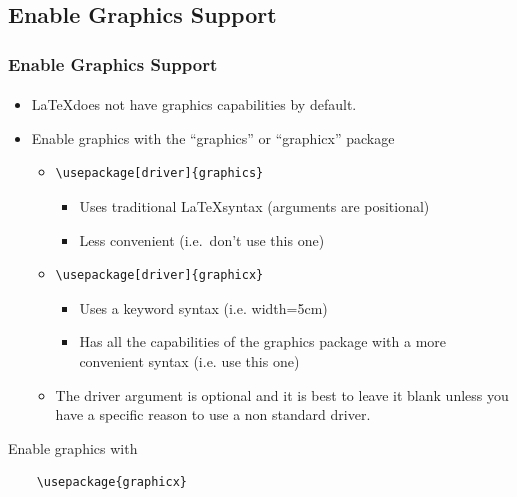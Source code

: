 \documentclass[article]{beamer}
\begin{document}
\subsection{Enable Graphics Support}
\begin{frame}
  \frametitle{Enable Graphics Support}
  \framesubtitle{}
  \begin{itemize}%
    \item \LaTeX does not have graphics capabilities by default.
    \item Enable graphics with the ``graphics'' or ``graphicx'' package
      \begin{itemize}%
        \item \begin{verbatim}\usepackage[driver]{graphics}\end{verbatim}
          \begin{itemize}%
            \item Uses traditional \LaTeX syntax (arguments are positional)
            \item Less convenient (i.e.\ don't use this one)
          \end{itemize}
        \item \begin{verbatim}\usepackage[driver]{graphicx}\end{verbatim} 
          \begin{itemize}%
            \item Uses a keyword syntax (i.e. width=5cm)
            \item Has all the capabilities of the graphics package with a more convenient syntax (i.e. use this one)
          \end{itemize}
        \item The driver argument is optional and it is best to leave it blank unless you have a specific reason to use a non standard driver.     
      \end{itemize}
  \end{itemize}
  \begin{alertblock}{Enable graphics with}
    \begin{verbatim}
    \usepackage{graphicx}
    \end{verbatim}  
  \end{alertblock}
\end{frame}
\end{document}
